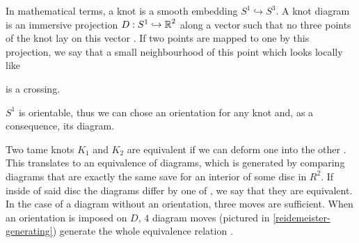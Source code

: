 In mathematical terms, a knot is a smooth embedding $S^1\hookrightarrow S^3$. A knot diagram is an {immersive projection} $D:S^1\hookrightarrow \operatorname{\mathbb{R}}^2$ along a vector such that no three points of the knot lay on this vector \cite[pages~2-3]{likorish-diagram}. If two points are mapped to one by this projection, we say that a small neighbourhood of this point which looks locally like  is a crossing.


$S^1$ is orientable, thus we can chose an orientation for any knot and, as a consequence, its diagram.

Two tame knots $K_1$ and $K_2$ are equivalent if we can deform one into the other
\cite[pages~7-8]{murasagi-equivalence}. This translates to an equivalence of diagrams, which is generated by comparing diagrams that are exactly the same save for an interior of some disc in $R^2$. If inside of said disc the diagrams differ by one of , we say that they are equivalent. 
%
%
In the case of a diagram without an orientation, three moves are sufficient. When an orientation is imposed on $D$, $4$ diagram moves (pictured in \cref{reidemeister-generating}) generate the whole equivalence relation \cite{ruchy_zorientowane}.

